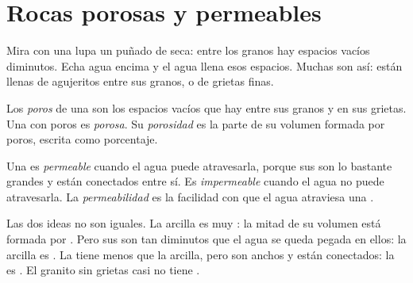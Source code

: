 \section{Rocas porosas y permeables}

Mira con una lupa un puñado de  seca: entre los granos hay espacios
vacíos diminutos. Echa agua encima y el agua llena esos espacios. Muchas
 son así: están llenas de agujeritos entre sus granos, o de grietas
finas.

\begin{definition}[Porosidad]\label{def:g6:water-underground:porosity}
Los \emph{poros} de una  son los espacios vacíos que hay
entre sus granos y en sus grietas. Una  con poros es
\emph{porosa}. Su \emph{porosidad} es la
parte de su volumen formada por poros, escrita como porcentaje.
\end{definition}

\begin{definition}[Permeabilidad]\label{def:g6:water-underground:permeability}
Una  es \emph{permeable} cuando el agua puede
atravesarla, porque sus  son lo bastante grandes y están conectados
entre sí. Es \emph{impermeable} cuando el agua no puede
atravesarla. La \emph{permeabilidad} es la facilidad
con que el agua atraviesa una .
\end{definition}

Las dos ideas no son iguales. La arcilla es muy : la mitad de su
volumen está formada por . Pero sus  son tan diminutos que el agua
se queda pegada en ellos: la arcilla es \emph{}. La  tiene
menos  que la arcilla, pero son anchos y están conectados: la  es
\emph{}. El granito sin grietas casi no tiene .

